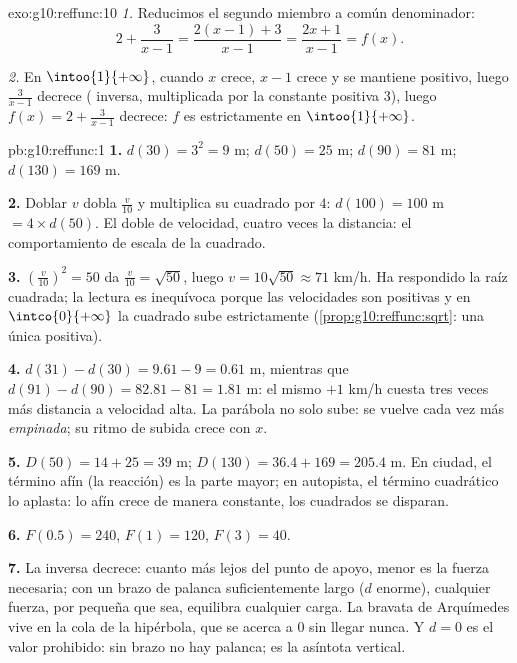 \begin{solution}{exo:g10:reffunc:10}
\emph{1.} Reducimos el segundo miembro a común denominador:
\[
2 + \frac{3}{x-1} = \frac{2(x-1) + 3}{x - 1} = \frac{2x + 1}{x - 1}
= f(x).
\]

\emph{2.} En $\intoo{1}{+\infty}$, cuando $x$ crece, $x - 1$ crece y se
mantiene positivo, luego $\frac{3}{x-1}$ decrece ( inversa,
multiplicada por la constante positiva $3$), luego
$f(x) = 2 + \frac{3}{x-1}$ decrece: $f$ es estrictamente  en
$\intoo{1}{+\infty}$.
\end{solution}

\begin{solution}{pb:g10:reffunc:1}
\textbf{1.} $d(30) = 3^2 = 9$ m; $d(50) = 25$ m; $d(90) = 81$ m;
$d(130) = 169$ m.

\textbf{2.} Doblar $v$ dobla $\frac v{10}$ y multiplica su cuadrado por
$4$: $d(100) = 100$ m $= 4 \times d(50)$. El doble de velocidad, cuatro
veces la distancia: el comportamiento de escala de la  cuadrado.

\textbf{3.} $\left(\frac{v}{10}\right)^2 = 50$ da
$\frac{v}{10} = \sqrt{50}$, luego $v = 10\sqrt{50} \approx 71$ km/h. Ha
respondido la raíz cuadrada; la lectura es inequívoca porque las
velocidades son positivas y en $\intco{0}{+\infty}$ la  cuadrado
sube estrictamente (\cref{prop:g10:reffunc:sqrt}: una única 
positiva).

\textbf{4.} $d(31) - d(30) = 9.61 - 9 = 0.61$ m, mientras que
$d(91) - d(90) = 82.81 - 81 = 1.81$ m: el mismo $+1$ km/h cuesta tres
veces más distancia a velocidad alta. La parábola no solo sube: se vuelve
cada vez más \emph{empinada}; su ritmo de subida crece con $x$.

\textbf{5.} $D(50) = 14 + 25 = 39$ m; $D(130) = 36.4 + 169 = 205.4$ m. En
ciudad, el término afín (la reacción) es la parte mayor; en autopista, el
término cuadrático lo aplasta: lo afín crece de manera constante, los
cuadrados se disparan.

\textbf{6.} $F(0.5) = 240$, $F(1) = 120$, $F(3) = 40$.

\textbf{7.} La  inversa decrece: cuanto más lejos del punto de
apoyo, menor es la fuerza necesaria; con un brazo de palanca
suficientemente largo ($d$ enorme), cualquier fuerza, por pequeña que
sea, equilibra cualquier carga. La bravata de Arquímedes vive en la cola
de la hipérbola, que se acerca a $0$ sin llegar nunca. Y $d = 0$ es el
valor prohibido: sin brazo no hay palanca; es la asíntota vertical.


\end{solution}
